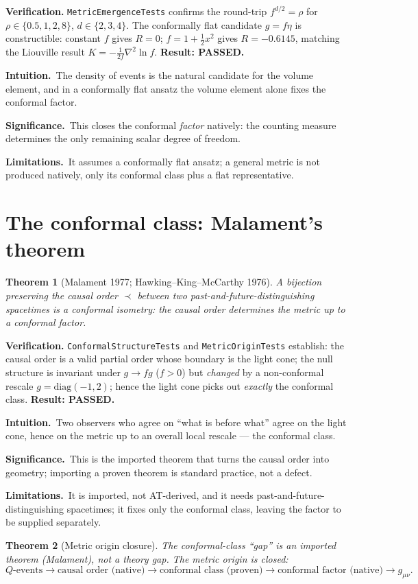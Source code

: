 \documentclass[10pt,twoside,openany]{book}
\newtheorem{theorem}{Theorem}[chapter]
\newcommand{\theoremnotes}[3]{%
  \par\medskip\noindent
  \textbf{Intuition.}\ #1\par
  \textbf{Significance.}\ #2\par
  \textbf{Limitations.}\ #3\par}
\begin{document}
\textbf{Verification.} \texttt{MetricEmergenceTests} confirms the round-trip
$f^{d/2}=\rho$ for $\rho\in\{0.5,1,2,8\}$, $d\in\{2,3,4\}$. The conformally flat candidate
$g=f\eta$ is constructible: constant $f$ gives $R=0$; $f=1+\tfrac12 x^2$ gives
$R=-0.6145$, matching the Liouville result $K=-\tfrac1{2f}\nabla^2\ln f$.
\textbf{Result: PASSED.}

\theoremnotes
{The density of events is the natural candidate for the volume element, and in a
conformally flat ansatz the volume element alone fixes the conformal factor.}
{This closes the conformal \emph{factor} natively: the counting measure determines the
only remaining scalar degree of freedom.}
{It assumes a conformally flat ansatz; a general metric is not produced natively, only
its conformal class plus a flat representative.}

\section{The conformal class: Malament's theorem}

\begin{theorem}[Malament 1977; Hawking--King--McCarthy 1976]
A bijection preserving the causal order $\prec$ between two past-and-future-distinguishing
spacetimes is a conformal isometry: the causal order determines the metric \emph{up to a
conformal factor}.
\end{theorem}

\textbf{Verification.} \texttt{ConformalStructureTests} and \texttt{MetricOriginTests}
establish: the causal order is a valid partial order whose boundary is the light cone; the
null structure is invariant under $g\to f g$ ($f>0$) but \emph{changed} by a non-conformal
rescale $g=\mathrm{diag}(-1,2)$; hence the light cone picks out \emph{exactly} the
conformal class. \textbf{Result: PASSED.}

\theoremnotes
{Two observers who agree on ``what is before what'' agree on the light cone, hence on the
metric up to an overall local rescale --- the conformal class.}
{This is the imported theorem that turns the causal order into geometry; importing a
proven theorem is standard practice, not a defect.}
{It is imported, not AT-derived, and it needs past-and-future-distinguishing spacetimes;
it fixes only the conformal class, leaving the factor to be supplied separately.}

\begin{theorem}[Metric origin closure]
The conformal-class ``gap'' is an \emph{imported theorem} (Malament), not a theory gap.
The metric origin is closed:
\begin{equation}
Q\text{-events} \to \text{causal order (native)}
\to \text{conformal class (proven)}
\to \text{conformal factor (native)}
\to g_{\mu\nu}.
\end{equation}
\end{theorem}
\end{document}
